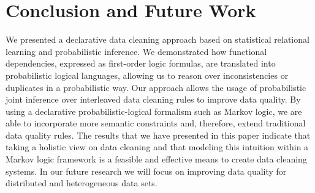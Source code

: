 
\section{Conclusion and Future Work}
\label{sec:conclusion}
We presented a declarative data cleaning approach based on statistical relational learning and probabilistic inference. We demonstrated how functional dependencies, expressed as first-order logic formulas, are translated into probabilistic logical languages, allowing us to reason over inconsistencies or duplicates in a probabilistic way. Our approach allows the usage of probabilistic joint inference over interleaved data cleaning rules to improve data quality. By using a declarative probabilistic-logical formalism such as Markov logic, we are able to incorporate more semantic constraints and, therefore, extend traditional data quality rules. The results that we have presented in this paper indicate that taking a holistic view on data cleaning and that modeling this intuition within a Markov logic framework is a feasible and effective means to create data cleaning systems. In our future research we will focus on improving data quality for distributed and heterogeneous data sets.